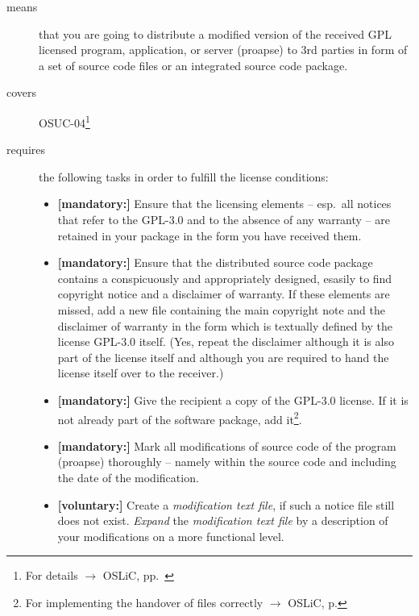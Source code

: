 \begin{description}
\item[means] that you are going to distribute a modified version of the received
GPL licensed program, application, or server (proapse) to 3rd parties in form
of a set of source code files or an integrated source code package.
\item[covers] OSUC-04\footnote{For details $\rightarrow$ OSLiC, pp.\ \pageref{OSUC-04-DEF}}

\item[requires] the following tasks in order to fulfill the license conditions:
\begin{itemize}
  
  \item \textbf{[mandatory:]} Ensure that the licensing elements -- esp.\ all
  notices that refer to the GPL-3.0 and to the absence of any
  warranty -- are retained in your package in the form you have received them.

  \item \textbf{[mandatory:]} Ensure that the distributed source code package
  contains a conspicuously and appropriately designed, esasily to find copyright
  notice and a disclaimer of warranty. If these elements are missed, add a new
  file containing the main copyright note and the disclaimer of warranty in the
  form which is textually defined by the license GPL-3.0 itself. (Yes, repeat
  the disclaimer although it is also part of the license itself and although you
  are required to hand the license itself over to the receiver.)
  
  \item \textbf{[mandatory:]} Give the recipient a copy of the GPL-3.0 license.
  If it is not already part of the software package, add it\footnote{For
  implementing the handover of files correctly $\rightarrow$ OSLiC, p.
  \pageref{DistributingFilesHint}}.
  
  

  \item \textbf{[mandatory:]} Mark all modifications of source code of the
  program (proapse) thoroughly -- namely within the source code and including
  the date of the modification.
  
  \item \textbf{[voluntary:]} Create a \emph{modification text file}, if such a
  notice file still does not exist. \emph{Expand} the \emph{modification text
  file} by a description of your modifications on a more functional level.
    

\end{itemize}
\end{description}
